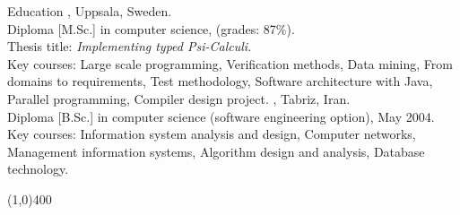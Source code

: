 \documentclass{resume}
\author{Amin Khorsandiaghai}
\begin{document}
\maketitle

\begin{category}{Education}
, Uppsala, Sweden. \\
Diploma [M.Sc.] in computer science, (grades: 87\%).\\
Thesis title: {\em Implementing typed Psi-Calculi.}\\
Key courses: Large scale programming, Verification methods, Data mining, From domains to requirements, Test methodology,
Software architecture with Java, Parallel programming, Compiler design project. 
, Tabriz, Iran.\\
Diploma [B.Sc.] in computer science (software engineering option), May 2004.\\
Key courses: Information system analysis and design, Computer networks, Management information systems, Algorithm design and analysis, Database technology.
\end{category}

\begin{center}
\line(1,0){400}
\end{center}

\end{document}
